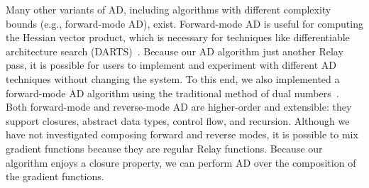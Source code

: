 Many other variants of AD, including algorithms with different
  complexity bounds (e.g., forward-mode AD), exist.
Forward-mode AD is useful for computing the
  Hessian vector product, which is necessary for techniques like differentiable architecture search
  (DARTS)~\cite{darts}.
Because our AD algorithm just another Relay pass,
  it is possible for users to implement and experiment with different
  AD techniques without changing the system.
To this end, we also implemented a  forward-mode AD algorithm using the traditional method of dual
  numbers~\cite{ad_survey}.
Both forward-mode and reverse-mode AD are higher-order and extensible: they
  support closures, abstract data types, control flow, and recursion.
Although we have not investigated
  composing forward and reverse modes,
  it is possible to mix gradient functions
  because they are regular Relay functions.
Because our algorithm enjoys a closure property,
  we can perform AD over the composition of the gradient
  functions.


